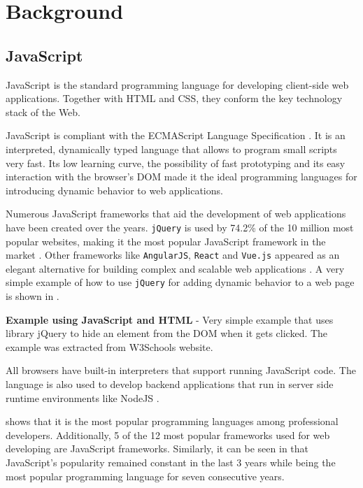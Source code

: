 \chapter{Background}\label{chap:background}
\section{JavaScript} \label{sec:background-javascript}
JavaScript is the standard programming language for developing client-side web applications. Together with HTML and CSS, they conform the key technology stack of the Web.

JavaScript is compliant with the ECMAScript Language Specification \citep{ecma-script}. It is an interpreted, dynamically typed language that allows to program small scripts very fast.  Its low learning curve, the possibility of fast prototyping and its easy interaction with the browser's DOM made it the ideal programming languages for introducing dynamic behavior to web applications.

Numerous JavaScript frameworks that aid the development of web applications have been created over the years. \texttt{jQuery} is used by 74.2\% of the 10 million most popular websites, making it the most popular JavaScript framework in the market \citep{jquery}\citep{w3techs-javascript-libraries-statistics}. Other frameworks like \texttt{AngularJS}, \texttt{React} and \texttt{Vue.js} appeared as an elegant alternative for building complex and scalable web applications \citep{angularjs}\citep{react}\citep{vuejs}. A very simple example of how to use \texttt{jQuery} for adding dynamic behavior to a web page is shown in .

\begin{code}
	\captionsetup{aboveskip=0pt, belowskip=10pt}
	\caption[Example using JavaScript and HTML]{\textbf{Example using JavaScript and HTML} - Very simple example that uses library jQuery to hide an element from the DOM when it gets clicked. The example was extracted from W3Schools website.}
	\label{code:background-jquery-example}
\end{code}

All browsers have built-in interpreters that support running JavaScript code. The language is also used to develop backend applications that run in server side runtime environments like NodeJS \citep{nodejs}.

 shows that it is the most popular programming languages among professional developers. Additionally, 5 of the 12 most popular frameworks used for web developing are JavaScript frameworks. Similarly, it can be seen in  that JavaScript's popularity remained constant in the last 3 years while being the most popular programming language for seven consecutive years.


